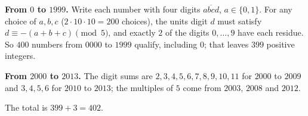 \textbf{From $0$ to $1999$.} Write each number with four digits $\overline{abcd}$, $a\in\{0,1\}$. For any choice of $a,b,c$ ($2\cdot10\cdot10=200$ choices), the units digit $d$ must satisfy $d\equiv-(a+b+c)\pmod5$, and exactly $2$ of the digits $0,\dots,9$ have each residue. So $400$ numbers from $0000$ to $1999$ qualify, including $0$; that leaves $399$ positive integers.

\textbf{From $2000$ to $2013$.} The digit sums are $2,3,4,5,6,7,8,9,10,11$ for $2000$ to $2009$ and $3,4,5,6$ for $2010$ to $2013$; the multiples of $5$ come from $2003$, $2008$ and $2012$.

The total is $399+3=\boxed{402}$.
